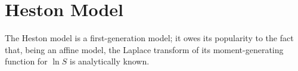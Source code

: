 \section{Heston Model}
The Heston model is a first-generation model; it owes its popularity to the fact that, being an affine model, the Laplace transform of its moment-generating function for \(\ln{S}\) is analytically known.